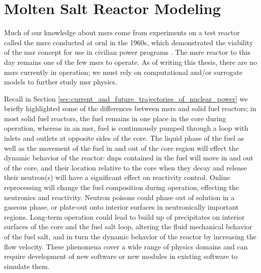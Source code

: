 \chapter{Molten Salt Reactor Modeling}%
\label{ch:chapter2}
\glsresetall
Much of our knowledge about \gls{msr}s come from experiments on a test reactor
called the \Gls{msre} conducted at \Gls{ornl} in the 1960s, which demonstrated
the viability of the \Gls{msr} concept for use in civilian power programs
\cite{haubenreich_experience_1970} \cite{rosenthal_history_1970}.
The \Gls{msre} reactor to this day remains one of the few \Gls{msr}s to operate.
As of writing this thesis, there are no \Gls{msr}s currently in operation; we
must rely on computational and/or surrogate models to further study \Gls{msr}
physics. 

Recall in Section \ref{sec:current_and_future_trajectories_of_nuclear_power}
we briefly highlighted some of the differences between \Gls{msr}s and
solid fuel reactors; in most solid fuel reactors, the fuel remains
in one place in the core during operation, whereas in an \Gls{msr}, fuel is continuously pumped
through a loop with inlets and outlets at opposite sides of the core. 
The liquid phase of the fuel as well as the movement of the fuel
in and out of the core region will effect the dynamic behavior of the
reactor: \gls{dnp}s contained in the fuel will move in and out of the core, and their
location relative to the core when they decay and release their neutron(s) will have a
significant effect on reactivity control. Online reprocessing will change the fuel composition
during operation, effecting the neutronics and reactivity. Neutron poisons could phase out of solution
in a gaseous phase, or plate-out onto interior surfaces in neutronically important regions.
Long-term operation could lead to build up of precipitates on interior surfaces of the core
and the fuel salt loop, altering the fluid mechanical behavior of the fuel salt, and in turn
the dynamic behavior of the reactor by increasing the flow velocity. These
phenomena cover a wide range of physics domains and can
require development of new software or new modules in existing software
to simulate them.

